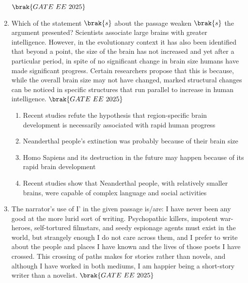 \documentclass[journal,12pt,onecolumn]{IEEEtran}
\theoremstyle{remark}
\begin{document}
\begin{enumerate}
\hfill $\brak{GATE\ EE\ 2025}$
    \begin{enumerate}
      \end{enumerate}
  \item Which of the statement $\brak{s}$ about the passage weaken $\brak{s}$ the argument presented? 
Scientists associate large brains with greater intelligence. However, in the evolutionary context it has also been identified that beyond a point, the size of the brain has not increased and yet after a particular period, in spite of no significant change in brain size humans have made significant progress. Certain researchers propose that this is because, while the overall brain size may not have changed, marked structural changes can be noticed in specific structures that run parallel to increase in human intelligence.    
\hfill $\brak{GATE\ EE\ 2025}$
    \begin{enumerate}
\item Recent studies refute the hypothesis that region-specific brain development is
necessarily associated with rapid human progress     
  \item Neanderthal people's extinction was probably because of their brain size   
  \item Homo Sapiens and its destruction in the future may happen because of its rapid
brain development   
  \item Recent studies show that Neanderthal people, with relatively smaller brains, were
capable of complex language and social activities   
  \end{enumerate}
  \item The narrator's use of I' in the given passage is/are:    
 I have never been any good at the more lurid sort of writing. Psychopathic killers, impotent war-heroes, self-tortured filmstars, and seedy espionage agents must exist in the world, but strangely enough I do not care across them, and I prefer to write about the people and places I have known and the lives of those poets I have crossed. This crossing of paths makes for stories rather than novels, and although I have worked in both mediums, I am happier being a short-story writer than a novelist. 
\hfill $\brak{GATE\ EE\ 2025}$

\end{enumerate}
\end{document}

